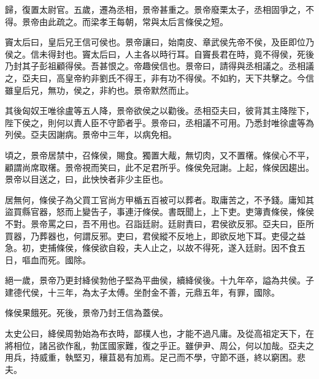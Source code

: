 歸，復置太尉官。五歲，遷為丞相，景帝甚重之。景帝廢栗太子，丞相固爭之，不得。景帝由此疏之。而梁孝王每朝，常與太后言條侯之短。

竇太后曰，皇后兄王信可侯也。景帝讓曰，始南皮、章武侯先帝不侯，及臣即位乃侯之。信未得封也。竇太后曰，人主各以時行耳。自竇長君在時，竟不得侯，死後乃封其子彭祖顧得侯。吾甚恨之。帝趣侯信也。景帝曰，請得與丞相議之。丞相議之，亞夫曰，高皇帝約非劉氏不得王，非有功不得侯。不如約，天下共擊之。今信雖皇后兄，無功，侯之，非約也。景帝默然而止。

其後匈奴王唯徐盧等五人降，景帝欲侯之以勸後。丞相亞夫曰，彼背其主降陛下，陛下侯之，則何以責人臣不守節者乎。景帝曰，丞相議不可用。乃悉封唯徐盧等為列侯。亞夫因謝病。景帝中三年，以病免相。

頃之，景帝居禁中，召條侯，賜食。獨置大胾，無切肉，又不置櫡。條侯心不平，顧謂尚席取櫡。景帝視而笑曰，此不足君所乎。條侯免冠謝。上起，條侯因趨出。景帝以目送之，曰，此怏怏者非少主臣也。

居無何，條侯子為父買工官尚方甲楯五百被可以葬者。取庸苦之，不予錢。庸知其盜買縣官器，怒而上變告子，事連汙條侯。書既聞上，上下吏。吏簿責條侯，條侯不對。景帝罵之曰，吾不用也。召詣廷尉。廷尉責曰，君侯欲反邪。亞夫曰，臣所買器，乃葬器也，何謂反邪。吏曰，君侯縱不反地上，即欲反地下耳。吏侵之益急。初，吏捕條侯，條侯欲自殺，夫人止之，以故不得死，遂入廷尉。因不食五日，嘔血而死。國除。

絕一歲，景帝乃更封絳侯勃他子堅為平曲侯，續絳侯後。十九年卒，謚為共侯。子建德代侯，十三年，為太子太傅。坐酎金不善，元鼎五年，有罪，國除。

條侯果餓死。死後，景帝乃封王信為蓋侯。

太史公曰，絳侯周勃始為布衣時，鄙樸人也，才能不過凡庸。及從高祖定天下，在將相位，諸呂欲作亂，勃匡國家難，復之乎正。雖伊尹、周公，何以加哉。亞夫之用兵，持威重，執堅刃，穰苴曷有加焉。足己而不學，守節不遜，終以窮困。悲夫。